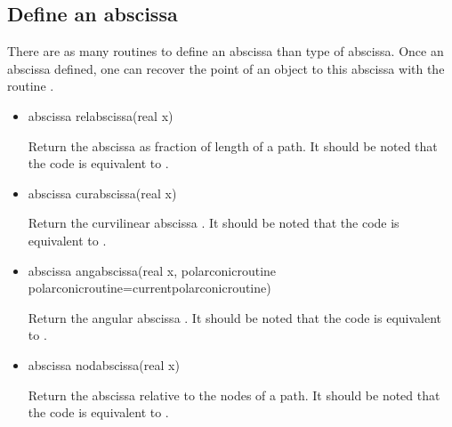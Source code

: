 \documentclass[pdftex]{article}
\begin{document}
\subsection{Define an abscissa}
There are as many routines to define an abscissa than type of
abscissa. Once an abscissa defined, one can recover the point of an
object to this abscissa with the routine .
\begin{itemize}
\item {}
  \begin{Vcolor}
    abscissa relabscissa(real x)
  \end{Vcolor}
  Return the abscissa  as fraction of length of a path.
  It should be noted that the code  is
  equivalent to .
\item {}
  \begin{Vcolor}
    abscissa curabscissa(real x)
  \end{Vcolor}
  Return the curvilinear abscissa .
  It should be noted that the code  is
  equivalent to .
\item {}
  \begin{Vcolor}
    abscissa angabscissa(real x,
    polarconicroutine polarconicroutine=currentpolarconicroutine)
  \end{Vcolor}
  Return the angular abscissa .
  It should be noted that the code  is
  equivalent to .
\item {}
  \begin{Vcolor}
    abscissa nodabscissa(real x)
  \end{Vcolor}
  Return the abscissa  relative to the nodes of a path.
  It should be noted that the code  is
  equivalent to .
\end{itemize}
\end{document}
